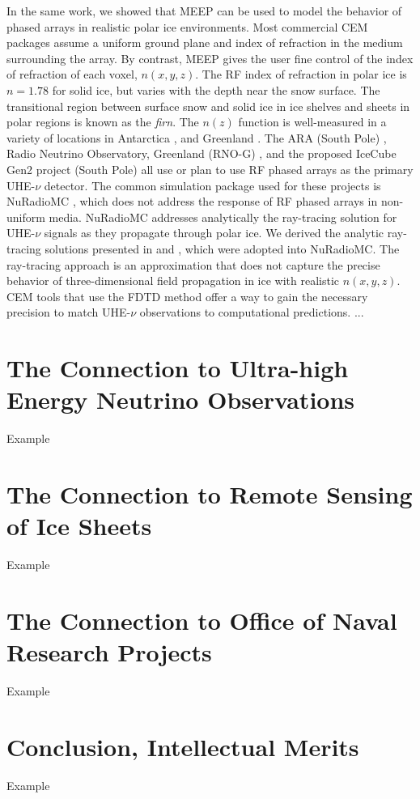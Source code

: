 \documentclass[../../main.tex]{subfiles}
\begin{document}
In the same work, we showed that MEEP can be used to model the behavior of phased arrays in realistic polar ice environments.  Most commercial CEM packages assume a uniform ground plane and index of refraction in the medium surrounding the array.  By contrast, MEEP gives the user fine control of the index of refraction of each voxel, $n(x,y,z)$.  The RF index of refraction in polar ice is $n = 1.78$ for solid ice, but varies with the depth near the snow surface.  The transitional region between surface snow and solid ice in ice shelves and sheets in polar regions is known as the \textit{firn}.  The $n(z)$ function is well-measured in a variety of locations in Antarctica \cite{horizPaper}, and Greenland \cite{deaconu_2018}.  The ARA (South Pole) \cite{PhysRevD.105.122006}, Radio Neutrino Observatory, Greenland (RNO-G) \cite{rno}, and the proposed IceCube Gen2 project (South Pole) \cite{Aartsen_2021} all use or plan to use RF phased arrays as the primary UHE-$\nu$ detector.  The common simulation package used for these projects is NuRadioMC \cite{10.1140/epjc/s10052-020-7612-8}, which does not address the response of RF phased arrays in non-uniform media.  NuRadioMC addresses analytically the ray-tracing solution for UHE-$\nu$ signals as they propagate through polar ice.  We derived the analytic ray-tracing solutions presented in \cite{horizPaper} and \cite{10.1140/epjc/s10052-020-7612-8}, which were adopted into NuRadioMC.  The ray-tracing approach is an approximation that does not capture the precise behavior of three-dimensional field propagation in ice with realistic $n(x,y,z)$.  CEM tools that use the FDTD method offer a way to gain the necessary precision to match UHE-$\nu$ observations to computational predictions. ...

%

\section{The Connection to Ultra-high Energy Neutrino Observations}
\label{sec:askaryan}

Example

\section{The Connection to Remote Sensing of Ice Sheets}
\label{sec:cresis}

Example

\section{The Connection to Office of Naval Research Projects}
\label{sec:onr}

Example

\section{Conclusion, Intellectual Merits}
\label{sec:conc_im}

Example
\end{document}
